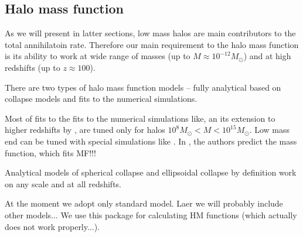 \subsection{Halo mass function}

As we will present in latter sections, low mass halos are main contributors to the total annihilatoin rate. Therefore our main requirement to the halo mass function is its ability to work at wide range of masses (up to $M \approx 10^{-12}M_\odot$) and at high redshifts (up to $z \approx 100$). 

There are two types of halo mass function models -- fully analytical based on collapse models and fits to the numerical simulations.

Most of fits to the fits to the numerical simulations like, \citet{Tinker_2008} an its extension to higher redshifts by \citet{Behroozi_2013}, are tuned only for halos $10^{8}M_\odot < M < 10^{15}M_\odot$. Low mass end can be tuned with special simulations like \cite{Diemand_2005}. In \cite{Schneider_2013}, the authors predict the mass function, which fits \cite{Diemand_2005} MF!!!

Analytical models of spherical collapse \citep{Press_1974} and ellipsoidal collapse \citep{Sheth_2001} by definition work on any scale and at all redshifts.

At the moment we adopt only standard \citet{Press_1974} model. Laer we will probably include other models... We use this package for calculating HM functions \cite{Murray_2013} (which actually does not work properly...).
